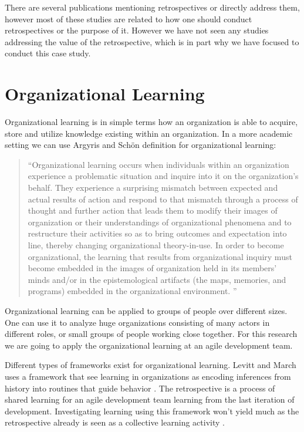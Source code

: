 There are several publications mentioning retrospectives or directly address them, however most of these studies are related to how one should conduct retrospectives or the purpose of it. However we have not seen any studies addressing the value of the retrospective, which is in part why we have focused to conduct this case study. 
\clearpage

\section{Organizational Learning}
\label{intro:organizational-learning}
Organizational learning is in simple terms how an organization is able to acquire, store and utilize knowledge existing within an organization. In a more academic setting we can use Argyris and Schön definition \cite{Argyris1996} for organizational learning: 

\begin{quote}
	``Organizational learning occurs when individuals within an organization experience a problematic situation and inquire into it on the organization's behalf. They experience a surprising mismatch between expected and actual results of action and respond to that mismatch through a process of thought and further action that leads them to modify their images of organization or their understandings of organizational phenomena and to restructure their activities so as to bring outcomes and expectation into line, thereby changing organizational theory-in-use. In order to become organizational, the learning that results from organizational inquiry must become embedded in the images of organization held in its members' minds and/or in the epistemological artifacts (the maps, memories, and programs) embedded in the organizational environment. ''
\end{quote}

Organizational learning can be applied to groups of people over different sizes. One can use it to analyze huge organizations consisting of many actors in different roles, or small groups of people working close together. For this research we are going to apply the organizational learning at an agile development team. 

Different types of frameworks exist for organizational learning. Levitt and March uses a framework that see learning in organizations as encoding inferences from history into routines that guide behavior \cite{Levitt1988}. The retrospective is a process of shared learning for an agile development team learning from the last iteration of development. Investigating learning using this framework won't yield much as the retrospective already is seen as a collective learning activity \cite{Dingsoyr2004}. 

